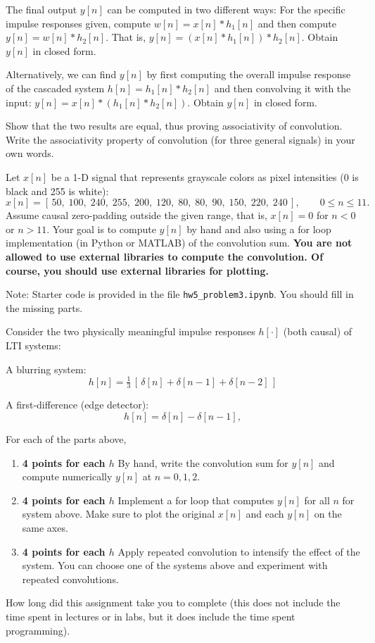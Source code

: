 \documentclass{ee102_pset}
\begin{document}
The final output $y[n]$ can be computed in two different ways:
\problempart [15 points] For the specific impulse responses given, compute $w[n] = x[n] * h_1[n]$ and then compute $y[n] = w[n] * h_2[n]$. That is, $y[n] = (x[n] * h_1[n]) * h_2[n]$. Obtain $y[n]$ in closed form.

\problempart [15 points] Alternatively, we can find $y[n]$ by first computing the overall impulse response of the cascaded system $h[n] = h_1[n] * h_2[n]$ and then convolving it with the input: $y[n] = x[n] * (h_1[n] * h_2[n])$. Obtain $y[n]$ in closed form.

\problempart [5 points] Show that the two results are equal, thus proving associativity of convolution. Write the associativity property of convolution (for three general signals) in your own words.


Let $x[n]$ be a 1-D signal that represents grayscale colors as pixel intensities (0 is black and 255 is white):
\[
x[n] = [\,50,\;100,\;240,\;255,\;200,\;120,\;80,\;80,\;90,\;150,\;220,\;240\,],
\qquad 0\le n\le 11.
\]
Assume causal zero-padding outside the given range, that is, $x[n]=0$ for $n<0$ or $n>11$. Your goal is to compute $y[n]$ by hand and also using a for loop implementation (in Python or MATLAB) of the convolution sum. \textbf{You are not allowed to use external libraries to compute the convolution. Of course, you should use external libraries for plotting.}

{\color{blue} Note: Starter code is provided in the file \texttt{hw5\_problem3.ipynb}. You should fill in the missing parts.}

Consider the two physically meaningful impulse responses $h[\cdot]$ (both causal) of LTI systems:

\problempart A blurring system:
\[
h[n]=\tfrac13\,[\,\delta[n]+\delta[n-1]+\delta[n-2]\,]
\]

\problempart A first-difference (edge detector):
\[
h[n]=\delta[n]-\delta[n-1],
\]

For each of the parts above, 
\begin{enumerate}
  \item \textbf{4 points for each $h$} By hand, write the convolution sum for $y[n]$ and compute numerically $y[n]$ at $n=0,1,2$.
  \item \textbf{4 points for each $h$} Implement a for loop that computes $y[n]$ for all $n$ for system above. Make sure to plot the original $x[n]$ and each $y[n]$ on the same axes.
  \item \textbf{4 points for each $h$} Apply repeated convolution to intensify the effect of the system. You can choose one of the systems above and experiment with repeated convolutions.
\end{enumerate}

\problempart [1 point] How long did this assignment take you to complete (this does not include the time spent in lectures or in labs, but it does include the time spent programming).
\end{document}
